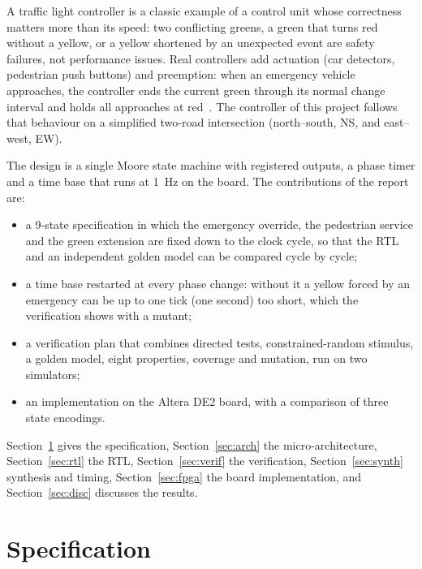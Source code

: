 \documentclass[conference]{IEEEtran}
\begin{document}
A traffic light controller is a classic example of a control unit whose
correctness matters more than its speed: two conflicting greens, a green that
turns red without a yellow, or a yellow shortened by an unexpected event are
safety failures, not performance issues. Real controllers add actuation (car
detectors, pedestrian push buttons) and preemption: when an emergency vehicle
approaches, the controller ends the current green through its normal change
interval and holds all approaches at red~\cite{fhwa08}. The controller of this
project follows that behaviour on a simplified two-road intersection
(north--south, NS, and east--west, EW).

The design is a single Moore state machine with registered outputs, a phase timer
and a time base that runs at 1~Hz on the board. The contributions of the report
are:
\begin{itemize}
\item a 9-state specification in which the emergency override, the pedestrian
      service and the green extension are fixed down to the clock cycle, so that
      the RTL and an independent golden model can be compared cycle by cycle;
\item a time base restarted at every phase change: without it a yellow forced by
      an emergency can be up to one tick (one second) too short, which the
      verification shows with a mutant;
\item a verification plan that combines directed tests, constrained-random
      stimulus, a golden model, eight properties, coverage and mutation, run on
      two simulators;
\item an implementation on the Altera DE2 board, with a comparison of three
      state encodings.
\end{itemize}

Section~\ref{sec:spec} gives the specification, Section~\ref{sec:arch} the
micro-architecture, Section~\ref{sec:rtl} the RTL, Section~\ref{sec:verif} the
verification, Section~\ref{sec:synth} synthesis and timing,
Section~\ref{sec:fpga} the board implementation, and Section~\ref{sec:disc}
discusses the results.

\section{Specification}\label{sec:spec}
\end{document}
